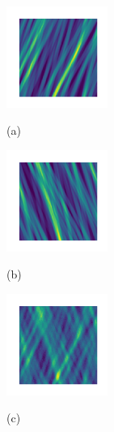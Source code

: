 \documentclass{article}
\begin{document}
\begin{figure}[t]
\begin{minipage}[b]{0.31\linewidth}
  \centering
  \centerline{\includegraphics[width=3.3cm]{source1}}
  \vspace{-0.15 in}
  \centerline{(a)}
\end{minipage}
\begin{minipage}[b]{0.31\linewidth}
  \centering
  \centerline{\includegraphics[width=3.3cm]{source2}}
  \vspace{-0.15 in}
  \centerline{(b)}
\end{minipage}
\begin{minipage}[b]{0.31\linewidth}
  \centering
  \centerline{\includegraphics[width=3.3cm]{meas_focus}}
  \vspace{-0.15 in}
  \centerline{(c)}
\end{minipage}


\end{figure}
\end{document}
